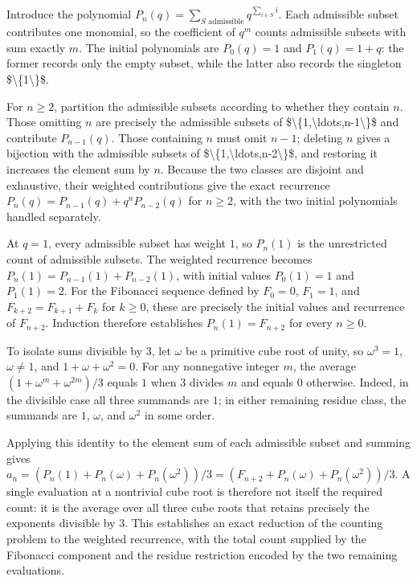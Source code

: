 \documentclass[11pt]{article}
\begin{document}
Introduce the polynomial $P_n(q)=\sum_{S\text{ admissible}}q^{\sum_{i\in S}i}$. Each admissible subset contributes one monomial, so the coefficient of $q^m$ counts admissible subsets with sum exactly $m$. The initial polynomials are $P_0(q)=1$ and $P_1(q)=1+q$: the former records only the empty subset, while the latter also records the singleton \$\textbackslash{}\{1\textbackslash{}\}\$.

For $n\geq 2$, partition the admissible subsets according to whether they contain $n$. Those omitting $n$ are precisely the admissible subsets of \$\textbackslash{}\{1,\textbackslash{}ldots,n-1\textbackslash{}\}\$ and contribute $P_{n-1}(q)$. Those containing $n$ must omit $n-1$; deleting $n$ gives a bijection with the admissible subsets of \$\textbackslash{}\{1,\textbackslash{}ldots,n-2\textbackslash{}\}\$, and restoring it increases the element sum by $n$. Because the two classes are disjoint and exhaustive, their weighted contributions give the exact recurrence $P_n(q)=P_{n-1}(q)+q^nP_{n-2}(q)$ for $n\geq 2$, with the two initial polynomials handled separately.

At $q=1$, every admissible subset has weight $1$, so $P_n(1)$ is the unrestricted count of admissible subsets. The weighted recurrence becomes $P_n(1)=P_{n-1}(1)+P_{n-2}(1)$, with initial values $P_0(1)=1$ and $P_1(1)=2$. For the Fibonacci sequence defined by $F_0=0$, $F_1=1$, and $F_{k+2}=F_{k+1}+F_k$ for $k\geq 0$, these are precisely the initial values and recurrence of $F_{n+2}$. Induction therefore establishes $P_n(1)=F_{n+2}$ for every $n\geq 0$.

To isolate sums divisible by $3$, let $\omega$ be a primitive cube root of unity, so $\omega^3=1$, $\omega\neq 1$, and $1+\omega+\omega^2=0$. For any nonnegative integer $m$, the average $(1+\omega^m+\omega^{2m})/3$ equals $1$ when $3$ divides $m$ and equals $0$ otherwise. Indeed, in the divisible case all three summands are $1$; in either remaining residue class, the summands are $1$, $\omega$, and $\omega^2$ in some order.

Applying this identity to the element sum of each admissible subset and summing gives $a_n=(P_n(1)+P_n(\omega)+P_n(\omega^2))/3=(F_{n+2}+P_n(\omega)+P_n(\omega^2))/3$. A single evaluation at a nontrivial cube root is therefore not itself the required count: it is the average over all three cube roots that retains precisely the exponents divisible by $3$. This establishes an exact reduction of the counting problem to the weighted recurrence, with the total count supplied by the Fibonacci component and the residue restriction encoded by the two remaining evaluations.
\end{document}
